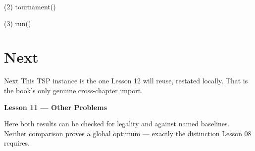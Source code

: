 \begin{frame}[fragile]{(2) tournament()}

\end{frame}

\begin{frame}[fragile]{(3) run()}

\end{frame}


\section{Next}

\begin{frame}{Next}
This TSP instance is the one Lesson 12 will reuse, restated locally. That is the book's only genuine cross-chapter import.

\vspace{0.8em}
\textbf{Lesson 11 --- Other Problems}

Here both results can be checked for legality and against named baselines. Neither comparison proves a global optimum --- exactly the distinction Lesson 08 requires.
\end{frame}

